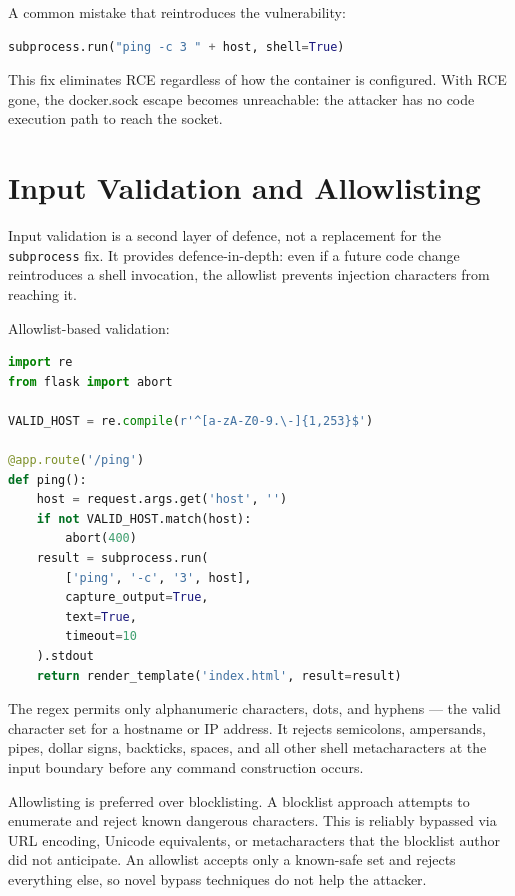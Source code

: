 A common mistake that reintroduces the vulnerability:

\begin{lstlisting}[language=python]
subprocess.run("ping -c 3 " + host, shell=True)
\end{lstlisting}

This fix eliminates RCE regardless of how the container is configured. With RCE gone, the docker.sock escape becomes unreachable: the attacker has no code execution path to reach the socket.


\section{Input Validation and Allowlisting}

Input validation is a second layer of defence, not a replacement for the \texttt{subprocess} fix. It provides defence-in-depth: even if a future code change reintroduces a shell invocation, the allowlist prevents injection characters from reaching it.

Allowlist-based validation:

\begin{lstlisting}[language=python]
import re
from flask import abort

VALID_HOST = re.compile(r'^[a-zA-Z0-9.\-]{1,253}$')

@app.route('/ping')
def ping():
    host = request.args.get('host', '')
    if not VALID_HOST.match(host):
        abort(400)
    result = subprocess.run(
        ['ping', '-c', '3', host],
        capture_output=True,
        text=True,
        timeout=10
    ).stdout
    return render_template('index.html', result=result)
\end{lstlisting}

The regex permits only alphanumeric characters, dots, and hyphens --- the valid character set for a hostname or IP address. It rejects semicolons, ampersands, pipes, dollar signs, backticks, spaces, and all other shell metacharacters at the input boundary before any command construction occurs.

Allowlisting is preferred over blocklisting. A blocklist approach attempts to enumerate and reject known dangerous characters. This is reliably bypassed via URL encoding, Unicode equivalents, or metacharacters that the blocklist author did not anticipate. An allowlist accepts only a known-safe set and rejects everything else, so novel bypass techniques do not help the attacker.

